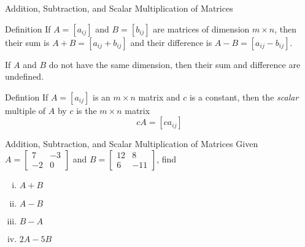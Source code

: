 \documentclass[t]{beamer}
\newcommand{\fb}[1]{\left[{#1}\right]} %
\begin{document}
	\begin{frame}{Addition, Subtraction, and Scalar Multiplication of Matrices}
		\begin{block}{Definition}
			If $A = \fb{a_{ij}}$ and $B = \fb{b_{ij}}$ are matrices of dimension $m\times n$, then their sum is $A + B = \fb{a_{ij} + b_{ij}}$ and their difference is $A - B = \fb{a_{ij} - b_{ij}}$. \vspace{12pt}
			
			If $A$ and $B$ do not have the same dimension, then their sum and difference are undefined.
		\end{block} \pause
	
		\begin{block}{Defintion}
			If $A = \fb{a_{ij}}$ is an $m\times n$ matrix and $c$ is a constant, then the \textit{scalar} multiple of $A$ by $c$ is the $m\times n$ matrix $$cA = \fb{ca_{ij}}$$
		\end{block}
	\end{frame}

	\begin{frame}{Addition, Subtraction, and Scalar Multiplication of Matrices}
		Given $A = \begin{bmatrix}
		7 & -3 \\ -2 & 0
		\end{bmatrix}$ and $B = \begin{bmatrix}
		12 & 8 \\ 6 & -11
		\end{bmatrix}$, find \begin{enumerate}[i)]
			\item $A + B$
			\item $A - B$
			\item $B - A$
			\item $2A - 5B$
		\end{enumerate}
	
		 \begin{flalign*}
		\end{flalign*}
	\end{frame}
\end{document}
